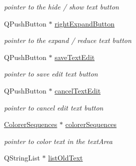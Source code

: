 \begin{DoxyCompactItemize}
\begin{DoxyCompactList}\small\item\em pointer to the hide / show text button \end{DoxyCompactList}\item 
\hypertarget{classArea_abe2c125e65ad35f1a154ec4b044a7cf1}{Q\+Push\+Button $\ast$ \hyperlink{classArea_abe2c125e65ad35f1a154ec4b044a7cf1}{right\+Expand\+Button}}\label{classArea_abe2c125e65ad35f1a154ec4b044a7cf1}

\begin{DoxyCompactList}\small\item\em pointer to the expand / reduce text button \end{DoxyCompactList}\item 
\hypertarget{classArea_a9f02653780f96daba713c2e71e562da6}{Q\+Push\+Button $\ast$ \hyperlink{classArea_a9f02653780f96daba713c2e71e562da6}{save\+Text\+Edit}}\label{classArea_a9f02653780f96daba713c2e71e562da6}

\begin{DoxyCompactList}\small\item\em pointer to save edit text button \end{DoxyCompactList}\item 
\hypertarget{classArea_a48b08ee11ec952b793e8d92dfc9ef7d4}{Q\+Push\+Button $\ast$ \hyperlink{classArea_a48b08ee11ec952b793e8d92dfc9ef7d4}{cancel\+Text\+Edit}}\label{classArea_a48b08ee11ec952b793e8d92dfc9ef7d4}

\begin{DoxyCompactList}\small\item\em pointer to cancel edit text button \end{DoxyCompactList}\item 
\hypertarget{classArea_a5dde170cf27046b457c18a7f05b78a51}{\hyperlink{classColorerSequences}{Colorer\+Sequences} $\ast$ \hyperlink{classArea_a5dde170cf27046b457c18a7f05b78a51}{colorer\+Sequences}}\label{classArea_a5dde170cf27046b457c18a7f05b78a51}

\begin{DoxyCompactList}\small\item\em pointer to color text in the text\+Area \end{DoxyCompactList}\item 
\hypertarget{classArea_a631ca23eb7e0c5d256239fae64768c1c}{Q\+String\+List $\ast$ \hyperlink{classArea_a631ca23eb7e0c5d256239fae64768c1c}{list\+Old\+Text}}\label{classArea_a631ca23eb7e0c5d256239fae64768c1c}


\end{DoxyCompactItemize}
